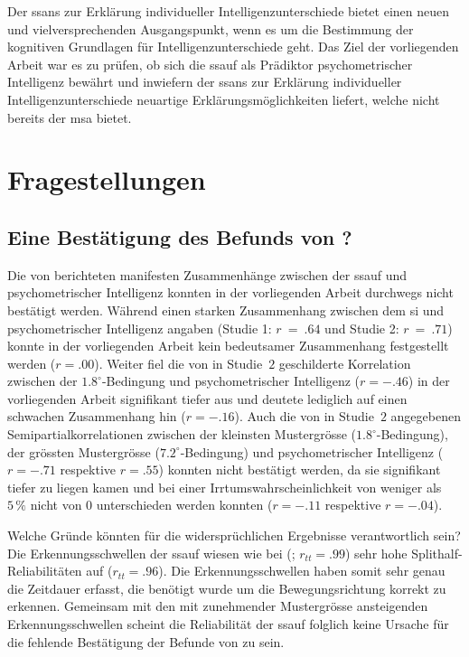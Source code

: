 \documentclass[11pt, twoside, a4paper]{book}		%
\begin{document}
Der \gls{ssans} zur Erklärung individueller Intelligenzunterschiede \citep{Melnick2013} bietet einen neuen und vielversprechenden Ausgangspunkt, wenn es um die Bestimmung der kognitiven Grundlagen für Intelligenzunterschiede geht.
Das Ziel der vorliegenden Arbeit war es zu prüfen, ob sich die \gls{ssauf} als Prädiktor psychometrischer Intelligenz bewährt und inwiefern der \gls{ssans} \citep{Melnick2013} zur Erklärung individueller Intelligenzunterschiede neuartige Erklärungsmöglichkeiten liefert, welche nicht bereits der \gls{msa} \citep[z. B.][]{Deary2000a, Jensen1982a, Jensen1982b, Jensen2006, Vernon1983} bietet. 



\section{Fragestellungen}

\subsection{Eine Bestätigung des Befunds von \citet{Melnick2013}?}

Die von \citeauthor{Melnick2013} berichteten manifesten Zusammenhänge zwischen der \gls{ssauf} und psychometrischer Intelligenz konnten in der vorliegenden Arbeit durchwegs nicht bestätigt werden. 
Während \citeauthor{Melnick2013} einen starken Zusammenhang zwischen dem \gls{si} und psychometrischer Intelligenz angaben (Studie 1: $r~=~.64$ und Studie 2: $r~=~.71$) konnte in der vorliegenden Arbeit kein bedeutsamer Zusammenhang festgestellt werden ($r=.00$). 
Weiter fiel die von \citeauthor{Melnick2013} in Studie~$2$ geschilderte Korrelation zwischen der $1.8^{\circ}$-Bedingung und psychometrischer Intelligenz ($r=-.46$) in der vorliegenden Arbeit signifikant tiefer aus und deutete lediglich auf einen schwachen Zusammenhang hin ($r=-.16$).
Auch die von \citeauthor{Melnick2013} in Studie~$2$ angegebenen Semipartialkorrelationen zwischen der kleinsten Mustergrösse ($1.8^{\circ}$-Bedingung), der grössten Mustergrösse ($7.2^{\circ}$-Bedingung) und psychometrischer Intelligenz ($r=-.71$ respektive $r=.55$) konnten nicht bestätigt werden, da sie signifikant tiefer zu liegen kamen und bei einer Irrtumswahrscheinlichkeit von weniger als $5\,\%$ nicht von $0$ unterschieden werden konnten ($r=-.11$ respektive $r=-.04$).

Welche Gründe könnten für die widersprüchlichen Ergebnisse verantwortlich sein? 
Die Erkennungsschwellen der \gls{ssauf} wiesen wie bei \citeauthor{Melnick2013} (\citeyear{Melnick2013}; $r_{tt} = .99$) sehr hohe Splithalf-Reliabilitäten auf ($r_{tt} = .96$). Die Erkennungsschwellen haben somit sehr genau die Zeitdauer erfasst, die benötigt wurde um die Bewegungsrichtung korrekt zu erkennen. 
Gemeinsam mit den mit zunehmender Mustergrösse ansteigenden Erkennungsschwellen scheint die Reliabilität der \gls{ssauf} folglich keine Ursache für die fehlende Bestätigung der Befunde von \citet{Melnick2013} zu sein. 
\end{document}

